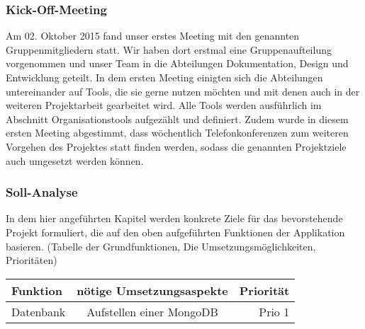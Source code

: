 \documentclass[12pt,a4paper]{article}
\begin{document}
\subsubsection{Kick-Off-Meeting}
Am 02. Oktober  2015 fand unser erstes Meeting mit den genannten Gruppenmitgliedern statt. 
Wir haben dort erstmal eine Gruppenaufteilung vorgenommen und unser Team in die Abteilungen Dokumentation, Design und Entwicklung geteilt. 
In dem ersten Meeting einigten sich die Abteilungen untereinander auf Tools, die sie gerne nutzen möchten und mit denen auch in der weiteren Projektarbeit gearbeitet wird. Alle Tools werden ausführlich im Abschnitt Organisationstools aufgezählt und definiert.
Zudem wurde in diesem ersten Meeting abgestimmt, dass wöchentlich Telefonkonferenzen zum weiteren Vorgehen des Projektes statt finden werden, sodass die genannten Projektziele auch umgesetzt werden können. 
\newpage

\subsubsection{Soll-Analyse}
In dem hier angeführten Kapitel werden konkrete Ziele für das bevorstehende Projekt formuliert, die auf den oben aufgeführten Funktionen der Applikation basieren. (Tabelle der Grundfunktionen, Die Umsetzungsmöglichkeiten, Prioritäten)

\begin{tabular}{|l|c|r|}
\hline
 Funktion & nötige Umsetzungsaspekte & Priorität \\
\hline
Datenbank & Aufstellen einer MongoDB & Prio 1\\
\end{tabular}
\end{document}
